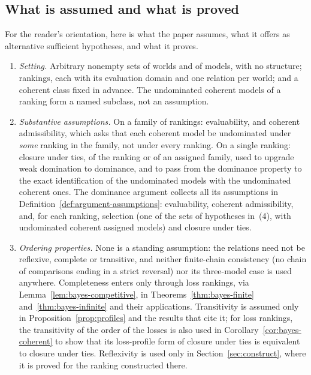 \documentclass[11pt]{article}
\theoremstyle{definition}
\theoremstyle{remark}
\begin{document}
\subsection{What is assumed and what is proved}\label{sec:inventory}
For the reader's orientation, here is what the paper assumes, what it offers as alternative sufficient hypotheses, and what it proves.
\begin{enumerate}[label=(\arabic*),leftmargin=*]
\item \emph{Setting.} Arbitrary nonempty sets of worlds and of models, with no structure; rankings, each with its evaluation domain and one relation per world; and a coherent class fixed in advance. The undominated coherent models of a ranking form a named subclass, not an assumption.
\item \emph{Substantive assumptions.} On a family of rankings: evaluability, and coherent admissibility, which asks that each coherent model be undominated under \emph{some} ranking in the family, not under every ranking. On a single ranking: closure under ties, of the ranking or of an assigned family, used to upgrade weak domination to dominance, and to pass from the dominance property to the exact identification of the undominated models with the undominated coherent ones. The dominance argument collects all its assumptions in Definition~\ref{def:argument-assumptions}: evaluability, coherent admissibility, and, for each ranking, selection (one of the sets of hypotheses in~(4), with undominated coherent assigned models) and closure under ties.
\item \emph{Ordering properties.} None is a standing assumption: the relations need not be reflexive, complete or transitive, and neither finite-chain consistency (no chain of comparisons ending in a strict reversal) nor its three-model case is used anywhere. Completeness enters only through loss rankings, via Lemma~\ref{lem:bayes-competitive}, in Theorems~\ref{thm:bayes-finite} and~\ref{thm:bayes-infinite} and their applications. Transitivity is assumed only in Proposition~\ref{prop:profiles} and the results that cite it; for loss rankings, the transitivity of the order of the losses is also used in Corollary~\ref{cor:bayes-coherent} to show that its loss-profile form of closure under ties is equivalent to closure under ties. Reflexivity is used only in Section~\ref{sec:construct}, where it is proved for the ranking constructed there.

\end{enumerate}
\end{document}
